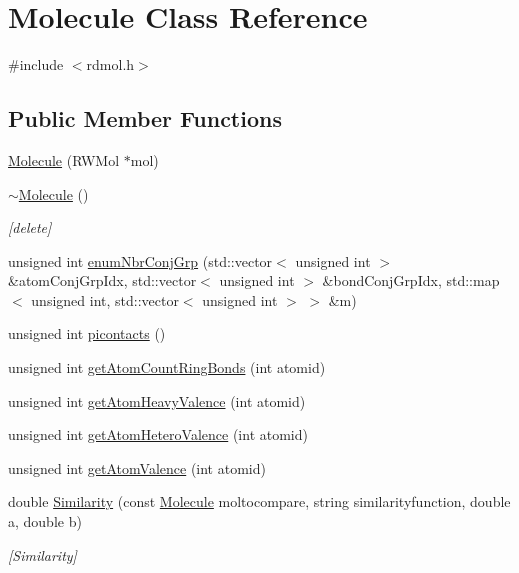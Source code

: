 \hypertarget{class_molecule}{}\section{Molecule Class Reference}
\label{class_molecule}


{\ttfamily \#include $<$rdmol.\+h$>$}

\subsection*{Public Member Functions}
\begin{DoxyCompactItemize}
\item 
\mbox{\hyperlink{class_molecule_a552677256bff6acac003617eddaa4233}{Molecule}} (R\+W\+Mol $\ast$mol)
\item 
\mbox{\hyperlink{class_molecule_a1ff980b574a62526abff3d631c83bf94}{$\sim$\+Molecule}} ()
\begin{DoxyCompactList}\small\item\em \mbox{[}delete\mbox{]} \end{DoxyCompactList}\item 
unsigned int \mbox{\hyperlink{class_molecule_a76f90edc870400248478fafdacd6efd3}{enum\+Nbr\+Conj\+Grp}} (std\+::vector$<$ unsigned int $>$ \&atom\+Conj\+Grp\+Idx, std\+::vector$<$ unsigned int $>$ \&bond\+Conj\+Grp\+Idx, std\+::map$<$ unsigned int, std\+::vector$<$ unsigned int $>$ $>$ \&m)
\item 
unsigned int \mbox{\hyperlink{class_molecule_a491c0807f620c690bb8b5eab3bf7efcf}{picontacts}} ()
\item 
unsigned int \mbox{\hyperlink{class_molecule_a180abc69d36d7909f3ed578475cc075c}{get\+Atom\+Count\+Ring\+Bonds}} (int atomid)
\item 
unsigned int \mbox{\hyperlink{class_molecule_ab20d6bcc1513a5dbe3648eec782003df}{get\+Atom\+Heavy\+Valence}} (int atomid)
\item 
unsigned int \mbox{\hyperlink{class_molecule_a1ff2823d05fb0c104bef3a2af09b4a21}{get\+Atom\+Hetero\+Valence}} (int atomid)
\item 
unsigned int \mbox{\hyperlink{class_molecule_a9fb0b5f467ac50bb3eac31d194b5fba7}{get\+Atom\+Valence}} (int atomid)
\item 
double \mbox{\hyperlink{class_molecule_a43f990a0c0e9f3952c4a1e2f0ba75117}{Similarity}} (const \mbox{\hyperlink{class_molecule}{Molecule}} moltocompare, string similarityfunction, double a, double b)
\begin{DoxyCompactList}\small\item\em \mbox{[}Similarity\mbox{]} \end{DoxyCompactList}\item 

\end{DoxyCompactItemize}
